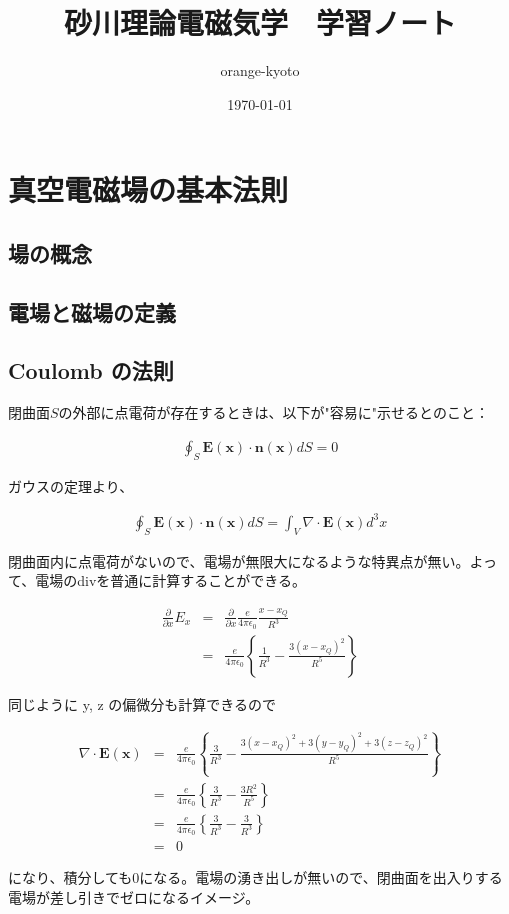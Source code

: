 \documentclass[a4j,12pt,uplatex,dvipdfmx]{jsreport}
\title{砂川理論電磁気学　学習ノート}
\author{orange-kyoto}
\date{\today}
\begin{document}
\maketitle

\tableofcontents
\clearpage


\chapter{真空電磁場の基本法則}

\section{場の概念}

\section{電場と磁場の定義}

\section{Coulomb の法則}

閉曲面$S$の外部に点電荷が存在するときは、以下が"容易に"示せるとのこと：

\begin{eqnarray*}
    \oint_{S} \bm{E}(\bm{x}) \cdot \bm{n}(\bm{x}) dS = 0
\end{eqnarray*}

ガウスの定理より、

\begin{eqnarray*}
    \oint_{S} \bm{E}(\bm{x}) \cdot \bm{n}(\bm{x}) dS = \int_{V} \nabla \cdot \bm{E}(\bm{x}) d^3 x
\end{eqnarray*}

閉曲面内に点電荷がないので、電場が無限大になるような特異点が無い。よって、電場のdivを普通に計算することができる。

\begin{eqnarray*}
    \frac{\partial}{\partial x} E_{x} 
    &=& \frac{\partial}{\partial x} \frac{e}{4 \pi \epsilon_0} \frac{x - x_{Q}}{R^3} \\
    &=& \frac{e}{4 \pi \epsilon_0} \left\{ \frac{1}{R^3} - \frac{3 ( x - x_{Q} )^2}{R^5} \right\} 
\end{eqnarray*}

同じように y, z の偏微分も計算できるので

\begin{eqnarray*}
    \nabla \cdot \bm{E}(\bm{x}) &=& \frac{e}{4 \pi \epsilon_0} \left\{ \frac{3}{R^3} - \frac{3 ( x - x_{Q} )^2 + 3 ( y - y_{Q} )^2 + 3 ( z - z_{Q} )^2}{R^5} \right\} \\
    &=& \frac{e}{4 \pi \epsilon_0} \left\{ \frac{3}{R^3} - \frac{3 R^2}{R^5} \right\} \\
    &=& \frac{e}{4 \pi \epsilon_0} \left\{ \frac{3}{R^3} - \frac{3}{R^3} \right\} \\
    &=& 0
\end{eqnarray*}

になり、積分しても$0$になる。電場の湧き出しが無いので、閉曲面を出入りする電場が差し引きでゼロになるイメージ。
\end{document}
